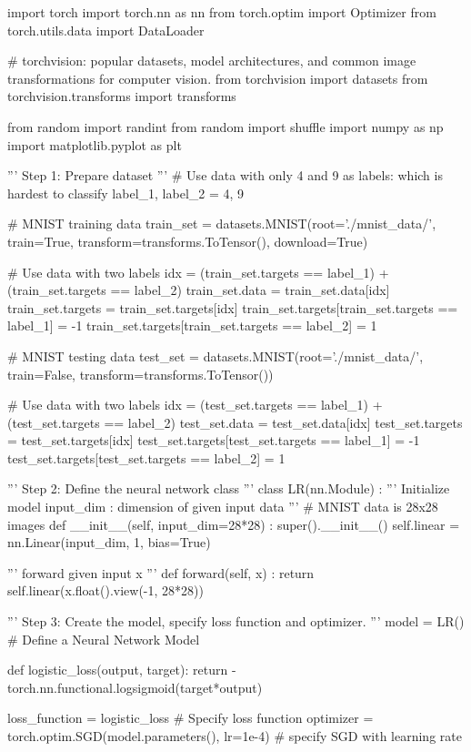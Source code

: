 \documentclass[10pt]{article}
\begin{document}
\begin{python}
import torch
import torch.nn as nn
from torch.optim import Optimizer
from torch.utils.data import DataLoader

# torchvision: popular datasets, model architectures, and common image transformations for computer vision.
from torchvision import datasets
from torchvision.transforms import transforms

from random import randint
from random import shuffle
import numpy as np
import matplotlib.pyplot as plt


'''
Step 1: Prepare dataset
'''
# Use data with only 4 and 9 as labels: which is hardest to classify
label_1, label_2 = 4, 9

# MNIST training data
train_set = datasets.MNIST(root='./mnist_data/', train=True, transform=transforms.ToTensor(), download=True)

# Use data with two labels
idx = (train_set.targets == label_1) + (train_set.targets == label_2)
train_set.data = train_set.data[idx]
train_set.targets = train_set.targets[idx]
train_set.targets[train_set.targets == label_1] = -1
train_set.targets[train_set.targets == label_2] = 1

# MNIST testing data
test_set = datasets.MNIST(root='./mnist_data/', train=False, transform=transforms.ToTensor())

# Use data with two labels
idx = (test_set.targets == label_1) + (test_set.targets == label_2)
test_set.data = test_set.data[idx]
test_set.targets = test_set.targets[idx]
test_set.targets[test_set.targets == label_1] = -1
test_set.targets[test_set.targets == label_2] = 1

'''
Step 2: Define the neural network class
'''
class LR(nn.Module) :
    '''
    Initialize model
        input_dim : dimension of given input data
    '''
    # MNIST data is 28x28 images
    def __init__(self, input_dim=28*28) :
        super().__init__()
        self.linear = nn.Linear(input_dim, 1, bias=True)

    ''' forward given input x '''
    def forward(self, x) :
        return self.linear(x.float().view(-1, 28*28))

'''
Step 3: Create the model, specify loss function and optimizer.
'''
model = LR()                                   # Define a Neural Network Model

def logistic_loss(output, target):
    return -torch.nn.functional.logsigmoid(target*output)

loss_function = logistic_loss                                                   # Specify loss function
optimizer = torch.optim.SGD(model.parameters(), lr=1e-4)   # specify SGD with learning rate


\end{python}
\end{document}

